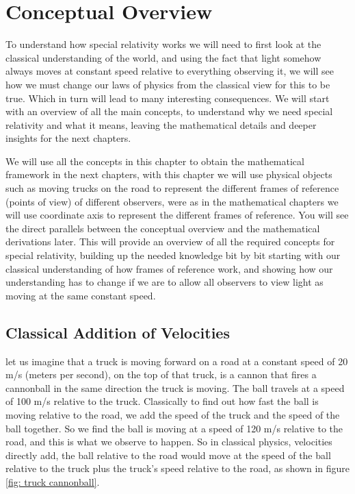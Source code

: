 \mainmatter
\chapter{Conceptual Overview}

To understand how special relativity works we will need to first look at the classical understanding of the world, and using the fact that light somehow always moves at constant speed relative to everything observing it, we will see how we must change our laws of physics from the classical view for this to be true. Which in turn will lead to many interesting consequences. We will start with an overview of all the main concepts, to understand why we need special relativity and what it means, leaving the mathematical details and deeper insights for the next chapters.

We will use all the concepts in this chapter to obtain the mathematical framework in the next chapters, with this chapter we will use physical objects such as moving trucks on the road to represent the different frames of reference (points of view) of different observers, were as in the mathematical chapters we will use coordinate axis to represent the different frames of reference. You will see the direct parallels between the conceptual overview and the mathematical derivations later. This will provide an overview of all the required concepts for special relativity, building up the needed knowledge bit by bit starting with our classical understanding of how frames of reference work, and showing how our understanding has to change if we are to allow all observers to view light as moving at the same constant speed.

\section{Classical Addition of Velocities}\label{Sect: classical velocity addition}

let us imagine that a truck is moving forward on a road at a constant speed of 20 m/s (meters per second), on the top of that truck, is a cannon that fires a cannonball in the same direction the truck is moving. The ball travels at a speed of 100 m/s relative to the truck. Classically to find out how fast the ball is moving relative to the road, we add the speed of the truck and the speed of the ball together. So we find the ball is moving at a speed of 120 m/s relative to the road, and this is what we observe to happen. So in classical physics, velocities directly add, the ball relative to the road would move at the speed of the ball relative to the truck plus the truck's speed relative to the road, as shown in figure \ref{fig: truck cannonball}.

